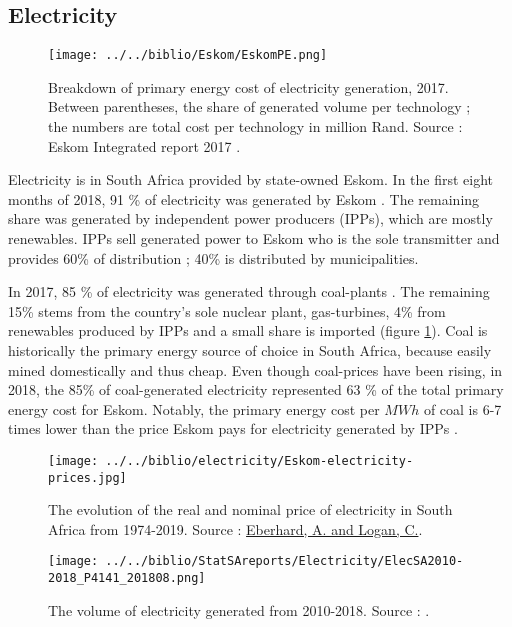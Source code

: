\documentclass[12pt,english]{article}
\begin{document}
\subsection{Electricity}


\begin{figure}[!h]
	\centering
	\texttt{[image: ../../biblio/Eskom/EskomPE.png]}
	\caption{\label{Eskom2017PE}Breakdown of primary energy cost of electricity generation, 2017. Between parentheses, the share of generated volume per technology ; the numbers are total cost per technology in million Rand. Source : Eskom Integrated report 2017 \citep{Eskom2017AR}.}
\end{figure}

Electricity is in South Africa provided by state-owned Eskom. In the first eight months of 2018, 91 \% of electricity was generated by Eskom \citep{P4141_201808}. The remaining share was generated by independent power producers (IPPs), which are mostly renewables. IPPs sell generated power to Eskom who is the sole transmitter and provides 60\% of distribution ; 40\% is distributed by municipalities.

In 2017, 85 \% of electricity was generated through coal-plants \citep{Eskom2017AR}. The remaining 15\% stems from the country's sole nuclear plant, gas-turbines, 4\% from renewables produced by IPPs and a small share is imported (figure \ref{Eskom2017PE}). Coal is historically the primary energy source of choice in South Africa, because easily mined domestically and thus cheap. Even though coal-prices have been rising, in 2018, the 85\% of coal-generated electricity represented 63 \% of the total primary energy cost for Eskom. Notably, the primary energy cost per $MWh$ of coal is 6-7 times lower than the price Eskom pays for electricity generated by IPPs \citep{Eskom2017AR}.  

\begin{figure}[!t]
	\centering
	\texttt{[image: ../../biblio/electricity/Eskom-electricity-prices.jpg]}
	\caption{\label{Eskom-electricity-prices} The evolution of the real and nominal price of electricity in South Africa from 1974-2019. Source : \href{https://mybroadband.co.za/news/business/68724-how-lecturers-tore-eskoms-tariff-case-apart-in-25-minutes.html}{Eberhard, A. and Logan, C.}.}
\end{figure}


\begin{figure}[!t]
	\centering
	\texttt{[image: ../../biblio/StatSAreports/Electricity/ElecSA2010-2018\_P4141\_201808.png]}
	\caption{\label{Elecvolume_2010_2018}The volume of electricity generated from 2010-2018. Source : \citep{P4141_201808}.}
\end{figure}
\end{document}
